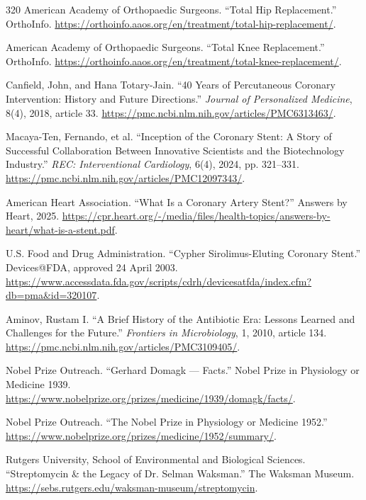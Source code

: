 \documentclass[12pt,oneside]{book}
\begin{document}
\begin{thebibliography}{320}
American Academy of Orthopaedic Surgeons. ``Total Hip Replacement.''
OrthoInfo. \url{https://orthoinfo.aaos.org/en/treatment/total-hip-replacement/}.

American Academy of Orthopaedic Surgeons. ``Total Knee Replacement.''
OrthoInfo. \url{https://orthoinfo.aaos.org/en/treatment/total-knee-replacement/}.

Canfield, John, and Hana Totary-Jain. ``40 Years of Percutaneous Coronary
Intervention: History and Future Directions.'' \emph{Journal of Personalized
Medicine}, 8(4), 2018, article 33.
\url{https://pmc.ncbi.nlm.nih.gov/articles/PMC6313463/}.

Macaya-Ten, Fernando, et al. ``Inception of the Coronary Stent: A Story of
Successful Collaboration Between Innovative Scientists and the Biotechnology
Industry.'' \emph{REC: Interventional Cardiology}, 6(4), 2024, pp. 321--331.
\url{https://pmc.ncbi.nlm.nih.gov/articles/PMC12097343/}.

American Heart Association. ``What Is a Coronary Artery Stent?'' Answers by
Heart, 2025. \url{https://cpr.heart.org/-/media/files/health-topics/answers-by-heart/what-is-a-stent.pdf}.

U.S. Food and Drug Administration. ``Cypher Sirolimus-Eluting Coronary
Stent.'' Devices@FDA, approved 24 April 2003.
\url{https://www.accessdata.fda.gov/scripts/cdrh/devicesatfda/index.cfm?db=pma&id=320107}.

Aminov, Rustam I. ``A Brief History of the Antibiotic Era: Lessons Learned
and Challenges for the Future.'' \emph{Frontiers in Microbiology}, 1, 2010,
article 134. \url{https://pmc.ncbi.nlm.nih.gov/articles/PMC3109405/}.

Nobel Prize Outreach. ``Gerhard Domagk --- Facts.'' Nobel Prize in Physiology
or Medicine 1939. \url{https://www.nobelprize.org/prizes/medicine/1939/domagk/facts/}.

Nobel Prize Outreach. ``The Nobel Prize in Physiology or Medicine 1952.''
\url{https://www.nobelprize.org/prizes/medicine/1952/summary/}.

Rutgers University, School of Environmental and Biological Sciences.
``Streptomycin \& the Legacy of Dr. Selman Waksman.'' The Waksman Museum.
\url{https://sebs.rutgers.edu/waksman-museum/streptomycin}.


\end{thebibliography}
\end{document}
